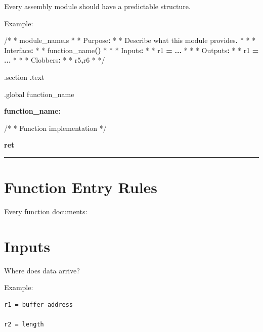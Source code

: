 \documentclass[
  oneside,
  openany]{book}
\newenvironment{Shaded}{\begin{snugshade}}{\end{snugshade}}
\newcommand{\BuiltInTok}[1]{#1}
\newcommand{\ControlFlowTok}[1]{\textcolor[rgb]{0.13,0.29,0.53}{\textbf{#1}}}
\newcommand{\FunctionTok}[1]{\textcolor[rgb]{0.13,0.29,0.53}{\textbf{#1}}}
\newcommand{\NormalTok}[1]{#1}
\newcommand{\OperatorTok}[1]{\textcolor[rgb]{0.81,0.36,0.00}{\textbf{#1}}}
\begin{document}
Every assembly module should have a predictable structure.

Example:

\begin{Shaded}
\begin{Highlighting}[]
\NormalTok{/*}
\NormalTok{ * module\_name}\OperatorTok{.}\NormalTok{s}
\NormalTok{ *}
\NormalTok{ * Purpose}\OperatorTok{:}
\NormalTok{ *}
\NormalTok{ *     Describe what this module provides}\OperatorTok{.}
\NormalTok{ *}
\NormalTok{ *}
\NormalTok{ * Interface}\OperatorTok{:}
\NormalTok{ *}
\NormalTok{ *     function\_name}\OperatorTok{()}
\NormalTok{ *}
\NormalTok{ *}
\NormalTok{ * Inputs}\OperatorTok{:}
\NormalTok{ *}
\NormalTok{ *     r1 }\OperatorTok{=} \OperatorTok{...}
\NormalTok{ *}
\NormalTok{ *}
\NormalTok{ * Outputs}\OperatorTok{:}
\NormalTok{ *}
\NormalTok{ *     r1 }\OperatorTok{=} \OperatorTok{...}
\NormalTok{ *}
\NormalTok{ *}
\NormalTok{ * Clobbers}\OperatorTok{:}
\NormalTok{ *}
\NormalTok{ *     r5}\OperatorTok{,}\NormalTok{r6}
\NormalTok{ *}
\NormalTok{ */}

\NormalTok{.}\BuiltInTok{section} \OperatorTok{.}\NormalTok{text}


\NormalTok{.global function\_name}


\FunctionTok{function\_name:}

\NormalTok{    /*}
\NormalTok{     * Function implementation}
\NormalTok{     */}


    \ControlFlowTok{ret}
\end{Highlighting}
\end{Shaded}

\begin{center}\rule{0.5\linewidth}{0.5pt}\end{center}

\hypertarget{function-entry-rules}{%
\section{Function Entry Rules}\label{function-entry-rules}}

Every function documents:

\hypertarget{inputs-1}{%
\section{Inputs}\label{inputs-1}}

Where does data arrive?

Example:

\begin{verbatim}
r1 = buffer address

r2 = length
\end{verbatim}
\end{document}
